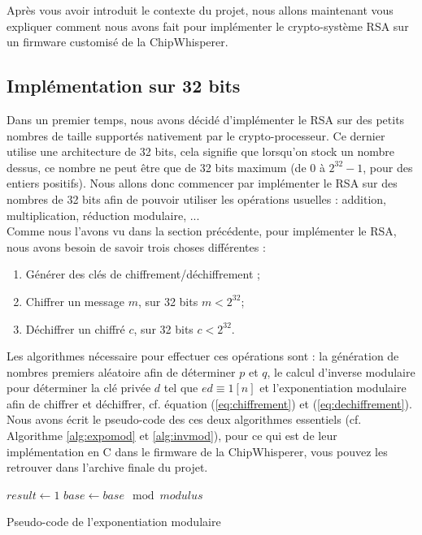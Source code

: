 Après vous avoir introduit le contexte du projet, nous allons maintenant vous expliquer comment nous avons fait pour implémenter le crypto-système RSA sur un firmware customisé de la ChipWhisperer.

\subsection{Implémentation sur 32 bits}
Dans un premier temps, nous avons décidé d'implémenter le RSA sur des petits nombres de taille supportés nativement par le crypto-processeur. Ce dernier utilise une architecture de 32 bits, cela signifie que lorsqu'on stock un nombre dessus, ce nombre ne peut être que de 32 bits maximum (de $0$ à $2^{32} - 1$, pour des entiers positifs). Nous allons donc commencer par implémenter le RSA sur des nombres de 32 bits afin de pouvoir utiliser les opérations usuelles : addition, multiplication, réduction modulaire, ...\\

Comme nous l'avons vu dans la section précédente, pour implémenter le RSA, nous avons besoin de savoir trois choses différentes :
\begin{enumerate}
	\item Générer des clés de chiffrement/déchiffrement ;
	\item Chiffrer un message $m$, sur 32 bits $m < 2^{32}$;
	\item Déchiffrer un chiffré $c$, sur 32 bits $c < 2^{32}$.
\end{enumerate}

Les algorithmes nécessaire pour effectuer ces opérations sont : la génération de nombres premiers aléatoire afin de déterminer $p$ et $q$, le calcul d'inverse modulaire pour déterminer la clé privée $d$ tel que $ed \equiv 1 [n]$ et l'exponentiation modulaire afin de chiffrer et déchiffrer, cf. équation (\ref{eq:chiffrement}) et (\ref{eq:dechiffrement}).\\

Nous avons écrit le pseudo-code des ces deux algorithmes essentiels (cf. Algorithme \ref{alg:expomod} et \ref{alg:invmod}), pour ce qui est de leur implémentation en C dans le firmware de la ChipWhisperer, vous pouvez les retrouver dans l'archive finale du projet.

\medskip
\begin{algorithm}[p]
\SetAlgoLined
{}
$result \leftarrow 1$\;
$base \leftarrow base \mod modulus$\;
\;
\caption{Pseudo-code de l'exponentiation modulaire}
\label{alg:expomod}
\end{algorithm}
\medskip

